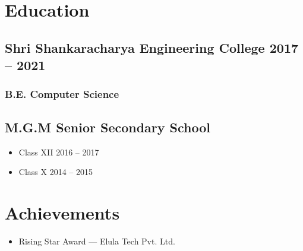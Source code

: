 \documentclass{article}
\newcommand{\rside}[1]{\hfill \normalfont\scshape\MakeLowercase{#1}}
\begin{document}
\section{\faGraduationCap\enspace Education}

\subsection{Shri Shankaracharya Engineering College \rside{2017 -- 2021}}
\subsubsection{B.E. Computer Science}

\subsection{M.G.M Senior Secondary School}
\begin{itemize}
\item Class XII \rside{2016 -- 2017}
\item Class X \rside{2014 -- 2015}
\end{itemize}

\section{\faTrophy\enspace Achievements}
\begin{itemize}
\item Rising Star Award — Elula Tech Pvt. Ltd.
\end{itemize}
\end{document}
